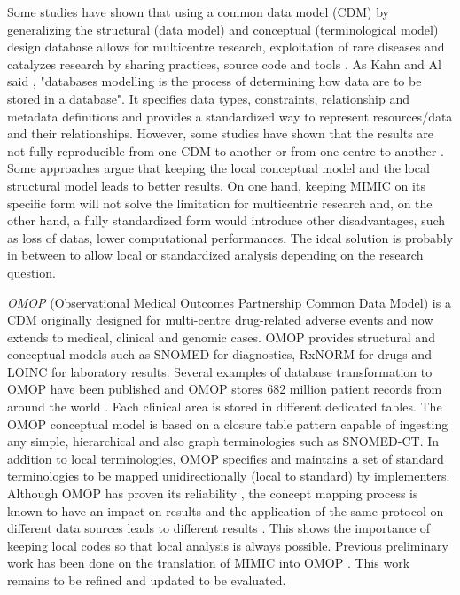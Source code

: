 Some studies have shown that using a common data model (CDM) by generalizing 
the structural (data model) and conceptual (terminological model) design database 
allows for multicentre research, exploitation of rare diseases 
and catalyzes research by sharing practices, source code and tools \cite{cdm-review,data-enclave}. 
As Kahn and Al said \cite{kahn-data-2012},  "databases modelling is the process 
of determining how data are to be stored in a database". 
It specifies data types, constraints, relationship and metadata definitions 
and provides a standardized way to represent resources/data and their relationships. 
However, some studies have shown that the results are not fully reproducible 
from one CDM to another \cite{cdm-comparison} or from one centre to another \cite{omop-replicability}. 
Some approaches argue that keeping the local conceptual model \cite{fhir-deep}
and the local structural model \cite{imi-protect} leads to better results. 
On one hand, keeping MIMIC on its specific form 
will not solve the limitation for multicentric research and, on the other hand, 
a fully standardized form would introduce other disadvantages, such as loss of datas,
lower computational performances.
The ideal solution is probably in between to allow 
local or standardized analysis depending on the research question.

\textit{OMOP} (Observational Medical Outcomes Partnership Common Data Model) 
is a CDM originally designed for multi-centre drug-related adverse events 
and now extends to medical, clinical and genomic cases. 
OMOP provides structural and conceptual models such as SNOMED for diagnostics, 
RxNORM for drugs and LOINC for laboratory results. Several examples of database 
transformation to OMOP have been published \cite{omop-german,omop-nashville} 
and OMOP stores 682 million patient records from around the world \cite{omop-bigboy}. 
Each clinical area is stored in different dedicated tables. 
The OMOP conceptual model is based on a closure table pattern \cite{closure-table} 
capable of ingesting any simple, hierarchical and also graph terminologies 
such as SNOMED-CT. In addition to local terminologies, OMOP specifies 
and maintains a set of standard terminologies to be mapped unidirectionally 
(local to standard) by implementers.
Although OMOP has proven its reliability \cite{omop-eval}, 
the concept mapping process is known to have an impact on results \cite{omop-concept-impact} 
and the application of the same protocol on different data sources 
leads to different results \cite{omop-replicability}. 
This shows the importance of keeping local codes so that local analysis is always possible.
Previous preliminary work has been done on the translation of MIMIC into OMOP \cite{mimic-omop-previous}. 
This work remains to be refined and updated to be evaluated.


